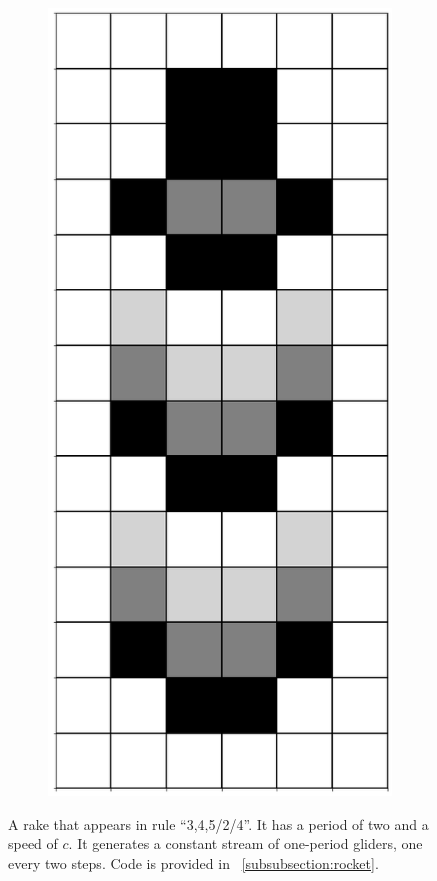 \documentclass[12pt]{article}
\numberwithin{figure}{section} %
\begin{document}
\begin{figure}[H]
\begin{subfigure}{0.18\textwidth}
     		\subcaption{}
   	\end{subfigure}
	\begin{subfigure}{0.18\textwidth}
     		\centering
     		\includegraphics[width=\linewidth]{Section4/34.4}
     		\subcaption{}
   	\end{subfigure}
   	\caption[A rocket glider]{A rake that appears in rule “3,4,5/2/4”. It has a period of two and a speed of $c$. It generates a constant stream of one-period gliders, one every two steps. Code is provided in ~\ref{subsubsection:rocket}.}
   	\label{fig:rocket}
      	\vspace{-1.5em}
\end{figure}
\end{document}
